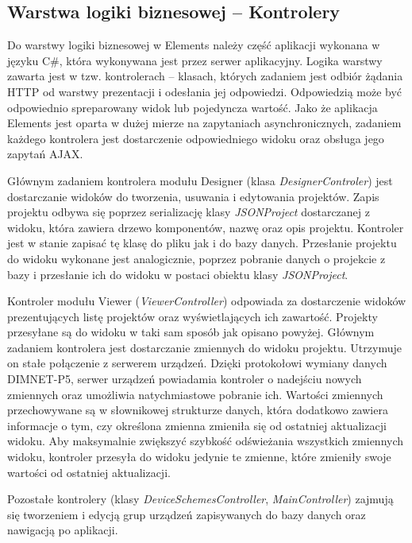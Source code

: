 \subsection{Warstwa logiki biznesowej -- Kontrolery}
Do warstwy logiki biznesowej w Elements należy część aplikacji wykonana w języku C\#, która wykonywana jest przez serwer aplikacyjny. Logika warstwy zawarta jest w tzw. kontrolerach -- klasach, których zadaniem jest odbiór żądania HTTP od warstwy prezentacji i odesłania jej odpowiedzi. Odpowiedzią może być odpowiednio spreparowany widok lub pojedyncza wartość. Jako że aplikacja Elements jest oparta w dużej mierze na zapytaniach asynchronicznych, zadaniem każdego kontrolera jest dostarczenie odpowiedniego widoku oraz obsługa jego zapytań AJAX.

Głównym zadaniem kontrolera modułu Designer (klasa \textit{DesignerControler}) jest dostarczanie widoków do tworzenia, usuwania i edytowania projektów. Zapis projektu odbywa się poprzez serializację klasy \textit{JSONProject} dostarczanej z widoku, która zawiera drzewo komponentów, nazwę oraz opis projektu. Kontroler jest w stanie zapisać tę klasę do pliku jak i do bazy danych. Przesłanie projektu do widoku wykonane jest analogicznie, poprzez pobranie danych o projekcie z bazy i przesłanie ich do widoku w postaci obiektu klasy \textit{JSONProject}. 

Kontroler modułu Viewer (\textit{ViewerController}) odpowiada za dostarczenie widoków prezentujących listę projektów oraz wyświetlających ich zawartość. Projekty przesyłane są do widoku w taki sam sposób jak opisano powyżej. Głównym zadaniem kontrolera jest dostarczanie zmiennych do widoku projektu. Utrzymuje on stałe połączenie z serwerem urządzeń. Dzięki protokołowi wymiany danych DIMNET-P5, serwer urządzeń powiadamia kontroler o nadejściu nowych zmiennych oraz umożliwia natychmiastowe pobranie ich. Wartości zmiennych przechowywane są w słownikowej strukturze danych, która dodatkowo zawiera informacje o tym, czy określona zmienna zmieniła się od ostatniej aktualizacji widoku. Aby maksymalnie zwiększyć szybkość odświeżania wszystkich zmiennych widoku, kontroler przesyła do widoku jedynie te zmienne, które zmieniły swoje wartości od ostatniej aktualizacji.

Pozostałe kontrolery (klasy \textit{DeviceSchemesController}, \textit{MainController}) zajmują się tworzeniem i edycją grup urządzeń zapisywanych do bazy danych oraz nawigacją po aplikacji.

